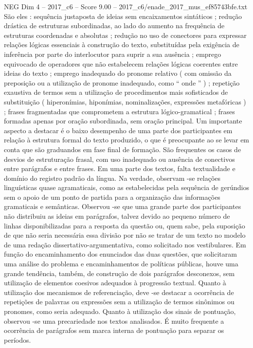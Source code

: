 \begin{textsample}{NEG Dim 4 – 2017\_c6 – Score 9.00 – 2017\_c6/enade\_2017\_mus\_ef85743bfe.txt}
São eles : sequência justaposta de ideias sem encaixamentos sintáticos ; redução drástica de estruturas subordinadas, ao lado do aumento na frequência de estruturas coordenadas e absolutas ; redução no uso de conectores para expressar relações lógicas essenciais à construção do texto, substituídas pela exigência de inferência por parte do interlocutor para suprir a sua ausência ; emprego equivocado de operadores que não estabelecem relações lógicas coerentes entre ideias do texto ; emprego inadequado do pronome relativo ( com omissão da preposição ou a utilização de pronome inadequado, como “ onde ” ) ; repetição exaustiva de termos sem a utilização de procedimentos mais sofisticados de substituição ( hiperonímias, hiponímias, nominalizações, expressões metafóricas ) ; frases fragmentadas que comprometem a estrutura lógico-gramatical ; frases formadas apenas por oração subordinada, sem oração principal.
Um importante aspecto a destacar é o baixo desempenho de uma parte dos participantes em relação à estrutura formal do texto produzido, o que é preocupante ao se levar em conta que são graduandos em fase final de formação.
São frequentes os casos de desvios de estruturação frasal, com uso inadequado ou ausência de conectivos entre parágrafos e entre frases.
Em uma parte dos textos, falta textualidade e domínio do registro padrão da língua.
Na verdade, observam -se relações linguísticas quase agramaticais, como as estabelecidas pela sequência de gerúndios sem o apoio de um ponto de partida para a organização das informações gramaticais e semânticas.
Observou -se que uma grande parte dos participantes não distribuiu as ideias em parágrafos, talvez devido ao pequeno número de linhas disponibilizadas para a resposta da questão ou, quem sabe, pela suposição de que não seria necessária essa divisão por não se tratar de um texto no modelo de uma redação dissertativo-argumentativa, como solicitado nos vestibulares.
Em função do encaminhamento dos enunciados das duas questões, que solicitaram uma análise do problema e encaminhamentos de políticas públicas, houve uma grande tendência, também, de construção de dois parágrafos desconexos, sem utilização de elementos coesivos adequados à progressão textual.
Quanto à utilização dos mecanismos de referenciação, deve -se destacar a ocorrência de repetições de palavras ou expressões sem a utilização de termos sinônimos ou pronomes, como seria adequado.
Quanto à utilização dos sinais de pontuação, observou -se uma precariedade nos textos analisados.
É muito frequente a ocorrência de parágrafos sem marca interna de pontuação para separar os períodos.

\end{textsample}
